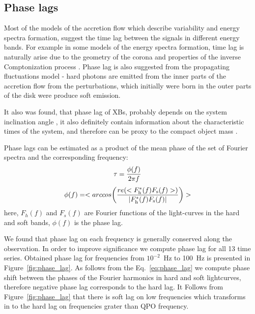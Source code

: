 \documentclass[a4paper,fleqn,usenatbib]{mnras}
\begin{document}
\begin{table}

\subsection{Phase lags}
    Most of the models of the accretion flow which describe variability and energy spectra formation, suggest the time lag between the signals in different energy bands. 
For example in some models of the energy spectra formation, time lag is naturally arise due to the geometry of the corona and properties of the inverse Comptonization process \citep[see, e.g.][]{kotov01}.
Phase lag is also suggested from the propagating fluctuations model - hard photons are emitted from the inner parts of the accretion flow from the perturbations, which initially were born in the outer parts of the disk were produce soft emission.  

It also was found, that phase lag of XBs, probably depends on the system inclination angle \citep{eijeden17}, it also definitely contain information about the characteristic times of the system, and therefore can be proxy to the compact object mass \citep{}. 

Phase lags can be estimated as a product of the mean phase of the set of Fourier spectra and the corresponding frequency:
\begin{equation}
                \tau = \frac{\phi(f)}{2\pi f}\\
\end{equation}
\begin{equation}
        \phi(f) = <arccos{\left(\frac{re(<F_{\rm h}^{*}(f)F_{\rm s}(f)>)}{|F_{\rm h}^{*}(f) F_{\rm s}(f)|}\right)}>
        \label{eq:phase_lag}
\end{equation}
here, $F_h(f)$ and $F_s(f)$ are Fourier functions of the light-curves in the hard and soft bands, $\phi(f)$ is the phase lag. 

We found that phase lag on each frequency is generally conserved along the observation.
In order to improve significance we compute phase lag for all 13 time series.
Obtained phase lag for frequencies from $10^{-2}$~Hz to 100~Hz is presented in Figure~\ref{fig:phase_lag}.
As follows from the Eq.~\ref{eq:phase_lag} we compute phase shift between the phases of the Fourier harmonics in hard and soft lightcurves, therefore negative phase lag corresponds to the hard lag.
It Follows from Figure~\ref{fig:phase_lag} that there is soft lag on low frequencies which transforms in to the hard lag on frequencies grater than QPO frequency. 


\end{table}
\end{document}
